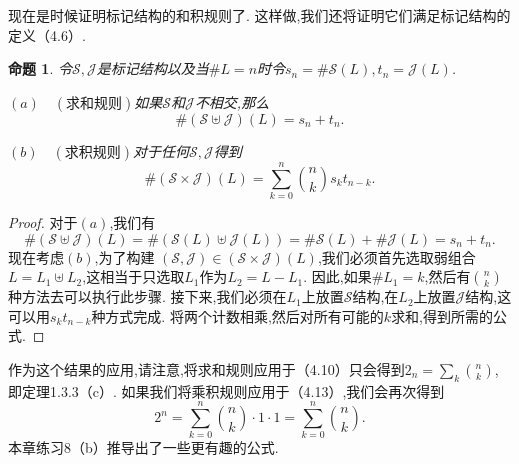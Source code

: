 \documentclass[a4paper,12pt]{ctexbook}
\newtheorem{proposition}[lemma]{\hspace{2em}命题}
\begin{document}
现在是时候证明标记结构的和积规则了.  这样做,我们还将证明它们满足标记结构的定义（4.6）.  
\begin{proposition}
	令$\mathcal{S},\mathcal{J}$是标记结构以及当$\#L=n$时令$s_n=\#\mathcal{S}(L),t_n=\mathcal{J}(L)$. 
	
	$(a)\quad(\text{求和规则})$如果$\mathcal{S}$和$\mathcal{J}$不相交,那么
	$$\#(\mathcal{S}\uplus\mathcal{J})(L)=s_n+t_n. $$
	
	$(b)\quad(\text{求积规则})$对于任何$\mathcal{S},\mathcal{J}$得到
	$$\#(\mathcal{S}\times\mathcal{J})(L)
	=\sum_{k= 0}^n\binom{n}{k}s_kt_{n-k}. $$
\end{proposition}
\begin{proof}
	对于$(a)$,我们有
	$$\#(\mathcal{S}\uplus\mathcal{J})(L)
	=\#(\mathcal{S}(L)\uplus\mathcal{J}(L))
	=\#\mathcal{S}(L)+\#\mathcal{J}(L)=s_n+t_n. $$
	现在考虑$(b)$,为了构建
	$(\mathcal{S},\mathcal{J})\in(\mathcal{S}\times\mathcal{J})(L)$,我们必须首先选取弱组合
	$L=L_1\uplus L_2$,这相当于只选取$L_1$作为$L_2=L-L_1. $
	因此,如果$\#L_1=k$,然后有$\binom{n}{k}$种方法去可以执行此步骤. 
	接下来,我们必须在$L_1$上放置$\mathcal{S}$结构,在$L_2$上放置$\mathcal{J}$结构,这可以用$s_kt_{n-k}$种方式完成.  
	将两个计数相乘,然后对所有可能的$k$求和,得到所需的公式.  
\end{proof}

作为这个结果的应用,请注意,将求和规则应用于（4.10）只会得到$2_n=\sum_k\binom{n}{k}$,即定理1.3.3（c）.  如果我们将乘积规则应用于（4.13）,我们会再次得到
$$2^n=\sum_{k=0}^n\binom{n}{k}\cdot1\cdot1=\sum_{k=0}^n\binom{n}{k}. $$
本章练习8（b）推导出了一些更有趣的公式.  
\end{document}
